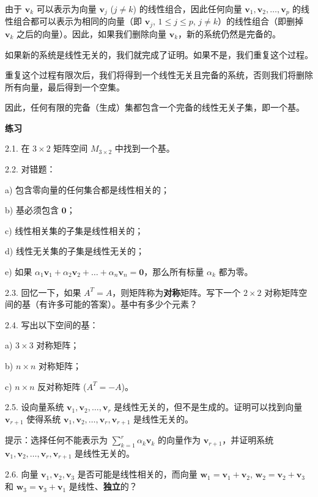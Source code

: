 由于 $\mathbf{v}_k$ 可以表示为向量 $\mathbf{v}_j$ ($j \neq k$) 的线性组合，因此任何向量 $\mathbf{v}_1, \mathbf{v}_2, \dots, \mathbf{v}_p$ 的线性组合都可以表示为相同的向量（即 $\mathbf{v}_j$, $1 \le j \le p$, $j \neq k$）的线性组合（即删掉 $\mathbf{v}_k$ 之后的向量）。因此，如果我们删除向量 $\mathbf{v}_k$，新的系统仍然是完备的。

如果新的系统是线性无关的，我们就完成了证明。如果不是，我们重复这个过程。

重复这个过程有限次后，我们将得到一个线性无关且完备的系统，否则我们将删除所有向量，最后得到一个空集。

因此，任何有限的完备（生成）集都包含一个完备的线性无关子集，即一个基。



\textbf{练习}~

2.1. 在 $3 \times 2$ 矩阵空间 $M_{3 \times 2}$ 中找到一个基。

2.2. 对错题：

a) 包含零向量的任何集合都是线性相关的；

b) 基必须包含 $\mathbf{0}$；

c) 线性相关集的子集是线性相关的；

d) 线性无关集的子集是线性无关的；

e) 如果 $\alpha_1 \mathbf{v}_1 + \alpha_2 \mathbf{v}_2 + \dots + \alpha_n \mathbf{v}_n = \mathbf{0}$，那么所有标量 $\alpha_k$ 都为零。

2.3. 回忆一下，如果 $A^T = A$，则矩阵称为\textbf{对称}矩阵。写下一个 $2 \times 2$ 对称矩阵空间的基（有许多可能的答案）。基中有多少个元素？

2.4. 写出以下空间的基：

a) $3 \times 3$ 对称矩阵；

b) $n \times n$ 对称矩阵；

c) $n \times n$ 反对称矩阵 ($A^T = -A$)。

2.5. 设向量系统 $\mathbf{v}_1, \mathbf{v}_2, \dots, \mathbf{v}_r$ 是线性无关的，但不是生成的。证明可以找到向量 $\mathbf{v}_{r+1}$ 使得系统 $\mathbf{v}_1, \mathbf{v}_2, \dots, \mathbf{v}_r, \mathbf{v}_{r+1}$ 是线性无关的。

提示：选择任何不能表示为 $\sum_{k=1}^r \alpha_k \mathbf{v}_k$ 的向量作为 $\mathbf{v}_{r+1}$，并证明系统 $\mathbf{v}_1, \mathbf{v}_2, \dots, \mathbf{v}_r, \mathbf{v}_{r+1}$ 是线性无关的。

2.6. 向量 $\mathbf{v}_1, \mathbf{v}_2, \mathbf{v}_3$ 是否可能是线性相关的，而向量 $\mathbf{w}_1 = \mathbf{v}_1 + \mathbf{v}_2$, $\mathbf{w}_2 = \mathbf{v}_2 + \mathbf{v}_3$ 和 $\mathbf{w}_3 = \mathbf{v}_3 + \mathbf{v}_1$ 是线性、\textbf{独立}的？



